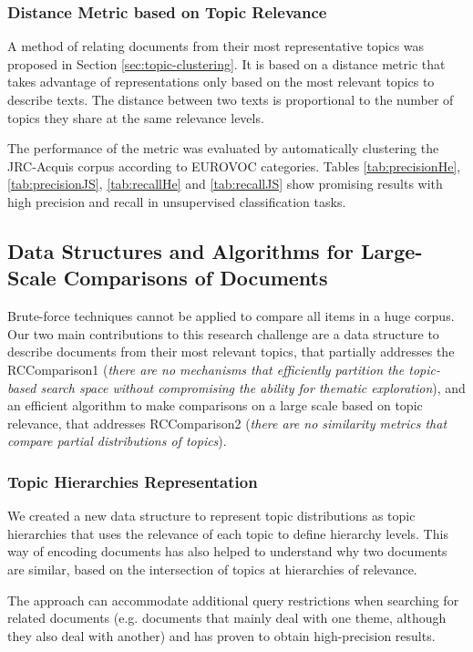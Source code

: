 \subsubsection{Distance Metric based on Topic Relevance}

A method of relating documents from their most representative topics was proposed in Section \ref{sec:topic-clustering}. It is based on a distance metric that takes advantage of representations only based on the most relevant topics to describe texts. The distance between two texts is proportional to the number of topics they share at the same relevance levels.

The performance of the metric was evaluated by automatically clustering the JRC-Acquis corpus according to EUROVOC categories. Tables \ref{tab:precisionHe}, \ref{tab:precisionJS}, \ref{tab:recallHe} and \ref{tab:recallJS} show promising results with high precision and recall in unsupervised classification tasks.


\subsection{Data Structures and Algorithms for Large-Scale Comparisons of Documents}

Brute-force techniques cannot be applied to compare all items in a huge corpus. Our two main contributions to this research challenge are a data structure to describe documents from their most relevant topics, that partially addresses the RCComparison1 (\textit{there are no mechanisms that efficiently partition the topic-based search space without compromising the ability for thematic exploration}), and an efficient algorithm to make comparisons on a large scale based on topic relevance, that addresses RCComparison2 (\textit{there are no similarity metrics that compare partial distributions of topics}).

\subsubsection{Topic Hierarchies Representation}

We created a new data structure to represent topic distributions as topic hierarchies that uses the relevance of each topic to define hierarchy levels. This way of encoding documents has also helped to understand why two documents are similar, based on the intersection of topics at hierarchies of relevance.

The approach can accommodate additional query restrictions when searching for related documents (e.g. documents that mainly deal with one theme, although they also deal with another) and has proven to obtain high-precision results. 

